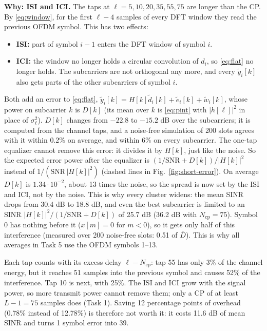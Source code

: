 \documentclass[11pt,a4paper]{article}
\newcommand{\Ncp}{N_{\mathrm{cp}}}
\newcommand{\SNR}{\mathrm{SNR}}
\newcommand{\yt}{\tilde{y}}
\newcommand{\dt}{\tilde{d}}
\newcommand{\wt}{\tilde{w}}
\begin{document}
\textbf{Why: ISI and ICI.} The taps at $\ell = 5, 10, 20, 35, 55, 75$ are longer than the CP. By
\eqref{eq:window}, for the first $\ell - 4$ samples of every DFT window they read the previous OFDM
symbol. This has two effects:
\begin{itemize}
  \item \textbf{ISI:} part of symbol $i - 1$ enters the DFT window of symbol $i$.
  \item \textbf{ICI:} the window no longer holds a circular convolution of $d_i$, so \eqref{eq:flat} no
        longer holds. The subcarriers are not orthogonal any more, and every $\yt_i[k]$ also gets parts of
        the other subcarriers of symbol $i$.
\end{itemize}
Both add an error to \eqref{eq:flat}, $\yt_i[k] = H[k]\dt_i[k] + \tilde{e}_i[k] + \wt_i[k]$, whose power
on subcarrier $k$ is $D[k]$ (its mean over $k$ is \eqref{eq:pint} with $|h[\ell]|^2$ in place of $\sigma_\ell^2$). $D[k]$ changes from
$-22.8$ to $-15.2$ dB over the subcarriers; it is computed from the channel taps, and a noise-free
simulation of 200 slots agrees with it within 0.2\% on average, and within 6\% on every subcarrier. The one-tap equalizer
cannot remove this error:
it divides it by $H[k]$, just like the noise. So the expected error power after the equalizer is
$(1/\SNR + D[k])/|H[k]|^2$ instead of $1/(\SNR\,|H[k]|^2)$ (dashed lines in
Fig.~\ref{fig:short-error}). On average $D[k]$ is $1.34 \cdot 10^{-2}$, about 13 times the noise, so the
spread is now set by the ISI and ICI, not by the noise. This is why every cluster widens: the mean SINR
drops from 30.4 dB to 18.8 dB, and even the best subcarrier is limited to an SINR
$|H[k]|^2/(1/\SNR + D[k])$ of 25.7 dB (36.2 dB with $\Ncp = 75$). Symbol 0 has nothing before it ($x[m] = 0$ for $m < 0$), so it
gets only half of this interference (measured over 200 noise-free slots: 0.51 of $\bar{D}$). This is why
all averages in Task 5 use the OFDM symbols 1--13.

Each tap counts with its excess delay $\ell - \Ncp$: tap 55 has only 3\% of the channel energy, but it
reaches 51 samples into the previous symbol and causes 52\% of the interference. Tap 10 is next, with
25\%. The ISI and ICI grow
with the signal power, so more transmit power cannot remove them; only a CP of at least $L - 1 = 75$
samples does (Task 1). Saving 12 percentage points of overhead (0.78\% instead of 12.78\%) is therefore
not worth it: it costs 11.6 dB of mean SINR and turns 1 symbol error into 39.

\FloatBarrier
\end{document}
